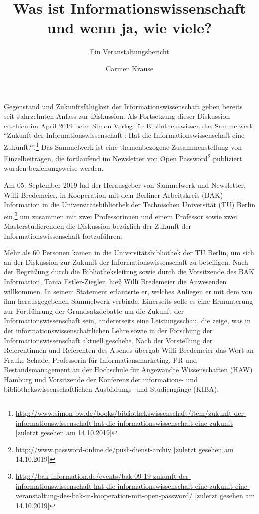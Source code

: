 \documentclass[a4paper,
fontsize=11pt,
oneside,
numbers=noperiodatend,
parskip=half-,
bibliography=totoc,
final
]{scrartcl}
\title{\LARGE{Was ist Informationswissenschaft und wenn ja, wie viele?}} %
\subtitle{\Large{Ein Veranstaltungsbericht}}
\author{Carmen Krause} %
\date{}
\begin{document}
\maketitle
\thispagestyle{fancyplain} 


Gegenstand und Zukunftsfähigkeit der Informationswissenschaft geben
bereits seit Jahrzehnten Anlass zur Diskussion. Als Fortsetzung dieser
Diskussion erschien im April 2019 beim Simon Verlag für
Bibliothekswissen das Sammelwerk \enquote{Zukunft der
Informationswissenschaft : Hat die Informationswissenschaft eine
Zukunft?}.\footnote{\url{http://www.simon-bw.de/books/bibliothekswissenschaft/item/zukunft-der-informationswissenschaft-hat-die-informationswissenschaft-eine-zukunft}
  {[}zuletzt gesehen am 14.10.2019{]}} Das Sammelwerk ist eine
themenbezogene Zusammenstellung von Einzelbeiträgen, die fortlaufend im
Newsletter von Open Password\footnote{\url{http://www.password-online.de/push-dienst-archiv}
  {[}zuletzt gesehen am 14.10.2019{]}} publiziert wurden beziehungsweise
werden.

Am 05. September 2019 lud der Herausgeber von Sammelwerk und Newsletter,
Willi Bredemeier, in Kooperation mit dem Berliner Arbeitskreis (BAK)
Information in die Universitätsbibliothek der Technischen Universität
(TU) Berlin ein,\footnote{\url{http://bak-information.de/events/bak-09-19-zukunft-der-informationswissenschaft-hat-die-informationswissenschaft-eine-zukunft-eine-veranstaltung-des-bak-in-kooperation-mit-open-password/}
  {[}zuletzt gesehen am 14.10.2019{]}} um zusammen mit zwei
Professorinnen und einem Professor sowie zwei Masterstudierenden die
Diskussion bezüglich der Zukunft der Informationswissenschaft
fortzuführen.

Mehr als 60 Personen kamen in die Universitätsbibliothek der TU Berlin,
um sich an der Diskussion zur Zukunft der Informationswissenschaft zu
beteiligen. Nach der Begrüßung durch die Bibliotheksleitung sowie durch
die Vorsitzende des BAK Information, Tania Estler-Ziegler, hieß Willi
Bredemeier die Anwesenden willkommen. In seinem Statement erläuterte er,
welches Anliegen er mit dem von ihm herausgegebenen Sammelwerk verbinde.
Einerseits solle es eine Ermunterung zur Fortführung der
Grundsatzdebatte um die Zukunft der Informationswissenschaft sein,
andererseits eine Leistungsschau, die zeige, was in der
informationswissenschaftlichen Lehre sowie in der Forschung der
Informationswissenschaft aktuell geschehe. Nach der Vorstellung der
Referentinnen und Referenten des Abends übergab Willi Bredemeier das
Wort an Frauke Schade, Professorin für Informationsmarketing, PR und
Bestandsmanagement an der Hochschule für Angewandte Wissenschaften (HAW)
Hamburg und Vorsitzende der Konferenz der informations- und
bibliothekswissenschaftlichen Ausbildungs- und Studiengänge (KIBA).
\end{document}
